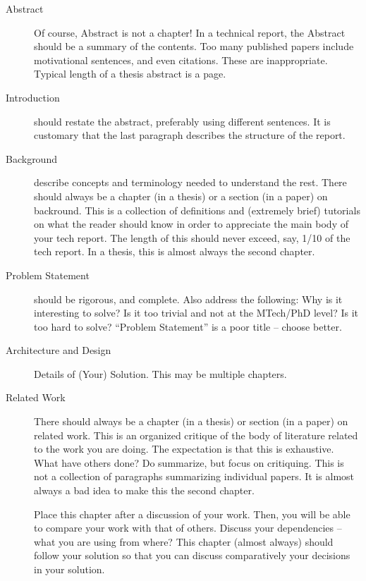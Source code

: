 \begin{description}
\item[Abstract]

  Of course, Abstract is not a chapter!  In a technical report, the
  Abstract should be a summary of the contents.  Too many published
  papers include motivational sentences, and even citations.  These
  are inappropriate.  Typical length of a thesis abstract is a page.  

\item
  [Introduction] should restate the abstract, preferably using
  different sentences.  It is customary that the last paragraph
  describes the structure of the report.

\item
  [Background] describe concepts and terminology needed to understand
  the rest.  There should always be a chapter (in a thesis) or a
  section (in a paper) on backround.  This is a collection of
  definitions and (extremely brief) tutorials on what the reader
  should know in order to appreciate the main body of your tech
  report.  The length of this should never exceed, say, 1/10 of the
  tech report.  In a thesis, this is almost always the second chapter.

\item
  [Problem Statement] should be rigorous, and complete.  Also address
  the following: Why is it interesting to solve? Is it too trivial and
  not at the MTech/PhD level? Is it too hard to solve?  ``Problem
  Statement'' is a poor title -- choose better.

\item [Architecture and Design]
  Details of (Your) Solution. This may be multiple chapters.

\item [Related Work] There should always be a chapter (in a thesis) or
  section (in a paper) on related work.  This is an organized critique
  of the body of literature related to the work you are doing.  The
  expectation is that this is exhaustive.  What have others done?  Do
  summarize, but focus on critiquing.  This is not a collection of
  paragraphs summarizing individual papers.  It is almost always a bad
  idea to make this the second chapter.

  Place this chapter after a discussion of your work.  Then, you will
  be able to compare your work with that of others.    Discuss your
  dependencies -- what you are using from where?  This chapter (almost
  always) should follow your solution so that you can discuss
  comparatively your decisions in your solution.


\end{description}

